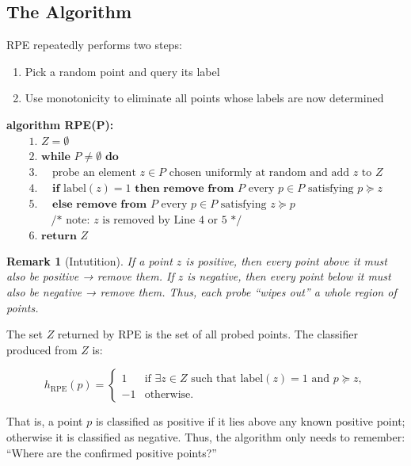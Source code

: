 \documentclass[11pt, a4paper]{article}
\theoremstyle{boxed}
\newtheorem{innerremark}{Remark}[section]
\newenvironment{remark}
  {\begin{mdframed}[style=notestyle]\begin{innerremark}}
  {\end{innerremark}\end{mdframed}}
\begin{document}
\subsection{The Algorithm}
RPE repeatedly performs two steps:
\begin{enumerate}
    \item Pick a random point and query its label
    \item Use monotonicity to eliminate all points whose labels are now determined
\end{enumerate}
\smallskip
\textbf{algorithm RPE(P):}
\[
\begin{array}{l}
\text{1. } Z = \emptyset \\
\text{2. } \textbf{while } P \neq \emptyset \textbf{ do} \\
\text{3. } \quad \text{probe an element } z \in P \text{ chosen uniformly at random and add } z \text{ to } Z \\
\text{4. } \quad \textbf{if } \text{label}(z) = 1 \textbf{ then remove from } P \text{ every } p \in P \text{ satisfying } p \succeq z \\
\text{5. } \quad \textbf{else remove from } P \text{ every } p \in P \text{ satisfying } z \succeq p \\
\qquad \text{/* note: } z \text{ is removed by Line 4 or 5 */} \\
\text{6. } \textbf{return } Z
\end{array}
\]

\begin{remark} [Intutition] If a point $z$ is positive, then every point above it must also be positive → remove them.
If $z$ is negative, then every point below it must also be negative → remove them.
Thus, each probe “wipes out” a whole region of points.
\end{remark}

The set $Z$ returned by RPE is the set of all probed points. The classifier produced from $Z$ is:

\[
h_{\text{RPE}}(p) = 
\begin{cases} 
 1 & \text{if } \exists z \in Z \text{ such that } \text{label}(z) = 1 \text{ and } p \succeq z, \\
 -1 & \text{otherwise}.
\end{cases}
\]

That is, a point $p$ is classified as positive if it lies above any known positive point; otherwise it is classified as negative. Thus, the algorithm only needs to remember:
“Where are the confirmed positive points?” 
\end{document}
